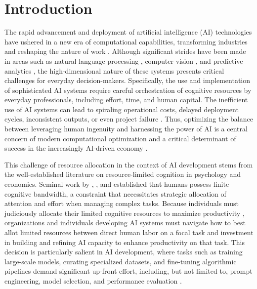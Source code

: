 \section{Introduction}
The rapid advancement and deployment of artificial intelligence (AI) technologies have ushered in a new era of computational capabilities, transforming industries and reshaping the nature of work \citep{hoffmann2024generative}. Although significant strides have been made in areas such as natural language processing \citep{vaswani2017attention}, computer vision \citep{he2016deep}, and predictive analytics \citep{bzdok2018machine}, the high-dimensional nature of these systems presents critical challenges for everyday decision-makers. Specifically, the use and implementation of sophisticated AI systems require careful orchestration of cognitive resources by everyday professionals, including effort, time, and human capital. The inefficient use of AI systems can lead to spiraling operational costs, delayed deployment cycles, inconsistent outputs, or even project failure \citep{heath2019prediction}. Thus, optimizing the balance between leveraging human ingenuity and harnessing the power of AI is a central concern of modern computational optimization and a critical determinant of success in the increasingly AI-driven economy \citep{furman2019ai}.

This challenge of resource allocation in the context of AI development stems from the well-established literature on resource-limited cognition in psychology and economics. Seminal work by \cite{simon1955behavioral}, \cite{kahneman1973attention}, and \cite{baumeister2018ego} established that humans possess finite cognitive bandwidth, a constraint that necessitates strategic allocation of attention and effort when managing complex tasks. Because individuals must judiciously allocate their limited cognitive resources to maximize productivity \citep{norman1975data}, organizations and individuals developing AI systems must navigate how to best allot limited resources between direct human labor on a focal task and investment in building and refining AI capacity to enhance productivity on that task. This decision is particularly salient in AI development, where tasks such as training large-scale models, curating specialized datasets, and fine-tuning algorithmic pipelines demand significant up-front effort, including, but not limited to, prompt engineering, model selection, and performance evaluation \citep{amodei2016concrete,mallen2024balancing}.

